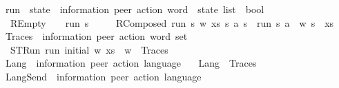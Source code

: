 \begin{isabellebody}
\isanewline
\isanewline
\isanewline
{}\isamarkupfalse%
\ run\ {\isacharcolon}{\kern0pt}{\isacharcolon}{\kern0pt}\ {\isachardoublequoteopen}{\isacharprime}{\kern0pt}state\ {\isasymRightarrow}\ {\isacharparenleft}{\kern0pt}{\isacharprime}{\kern0pt}information{\isacharcomma}{\kern0pt}\ {\isacharprime}{\kern0pt}peer{\isacharparenright}{\kern0pt}\ action\ word\ {\isasymRightarrow}\ {\isacharprime}{\kern0pt}state\ list\ {\isasymRightarrow}\ bool{\isachardoublequoteclose}\ \isanewline
\ \ REmpty{}{\isacharcolon}{\kern0pt}\ \ \ \ {\isachardoublequoteopen}run\ s\ {\isasymepsilon}\ {\isacharparenleft}{\kern0pt}{\isacharbrackleft}{\kern0pt}{\isacharbrackright}{\kern0pt}{\isacharparenright}{\kern0pt}{\isachardoublequoteclose}\ {\isacharbar}{\kern0pt}\isanewline
\ \ RComposed{}{\isacharcolon}{\kern0pt}\ {\isachardoublequoteopen}{\isasymlbrakk}run\ s{}\ w\ xs{\isacharsemicolon}{\kern0pt}\ s{}\ {\isasymmidarrow}a{\isasymrightarrow}\isactrlsub {\isasymC}\ s{}{\isasymrbrakk}\ {\isasymLongrightarrow}\ run\ s{}\ {\isacharparenleft}{\kern0pt}a\ {\isacharhash}{\kern0pt}\ w{\isacharparenright}{\kern0pt}\ {\isacharparenleft}{\kern0pt}s{}\ {\isacharhash}{\kern0pt}\ xs{\isacharparenright}{\kern0pt}{\isachardoublequoteclose}\isanewline
\isanewline
{}\isamarkupfalse%
\ Traces\ {\isacharcolon}{\kern0pt}{\isacharcolon}{\kern0pt}\ {\isachardoublequoteopen}{\isacharparenleft}{\kern0pt}{\isacharprime}{\kern0pt}information{\isacharcomma}{\kern0pt}\ {\isacharprime}{\kern0pt}peer{\isacharparenright}{\kern0pt}\ action\ word\ set{\isachardoublequoteclose}\ \isanewline
\ \ STRun{\isacharcolon}{\kern0pt}\ {\isachardoublequoteopen}run\ initial\ w\ xs\ {\isasymLongrightarrow}\ w\ {\isasymin}\ Traces{\isachardoublequoteclose}\isanewline
\isanewline
{}\isamarkupfalse%
\ Lang\ {\isacharcolon}{\kern0pt}{\isacharcolon}{\kern0pt}\ {\isachardoublequoteopen}{\isacharparenleft}{\kern0pt}{\isacharprime}{\kern0pt}information{\isacharcomma}{\kern0pt}\ {\isacharprime}{\kern0pt}peer{\isacharparenright}{\kern0pt}\ action\ language{\isachardoublequoteclose}\ \isanewline
\ \ {\isachardoublequoteopen}Lang\ {\isasymequiv}\ Traces{\isachardoublequoteclose}\isanewline
\isanewline
{}\isamarkupfalse%
\ LangSend\ {\isacharcolon}{\kern0pt}{\isacharcolon}{\kern0pt}\ {\isachardoublequoteopen}{\isacharparenleft}{\kern0pt}{\isacharprime}{\kern0pt}information{\isacharcomma}{\kern0pt}\ {\isacharprime}{\kern0pt}peer{\isacharparenright}{\kern0pt}\ action\ language{\isachardoublequoteclose}\ \isanewline

\end{isabellebody}
